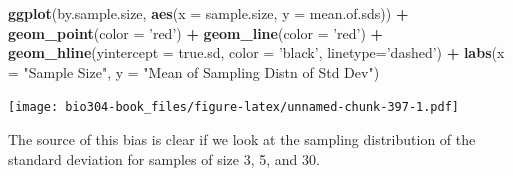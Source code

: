 \documentclass[]{book}
\newenvironment{Shaded}{\begin{snugshade}}{\end{snugshade}}
\newcommand{\CharTok}[1]{\textcolor[rgb]{0.31,0.60,0.02}{#1}}
\newcommand{\DataTypeTok}[1]{\textcolor[rgb]{0.13,0.29,0.53}{#1}}
\newcommand{\DecValTok}[1]{\textcolor[rgb]{0.00,0.00,0.81}{#1}}
\newcommand{\FloatTok}[1]{\textcolor[rgb]{0.00,0.00,0.81}{#1}}
\newcommand{\KeywordTok}[1]{\textcolor[rgb]{0.13,0.29,0.53}{\textbf{#1}}}
\newcommand{\NormalTok}[1]{#1}
\newcommand{\OperatorTok}[1]{\textcolor[rgb]{0.81,0.36,0.00}{\textbf{#1}}}
\newcommand{\StringTok}[1]{\textcolor[rgb]{0.31,0.60,0.02}{#1}}
\theoremstyle{definition}
\theoremstyle{definition}
\theoremstyle{definition}
\theoremstyle{remark}
\begin{document}
\begin{Shaded}
\begin{Highlighting}[]
\KeywordTok{ggplot}\NormalTok{(by.sample.size, }\KeywordTok{aes}\NormalTok{(}\DataTypeTok{x =}\NormalTok{ sample.size, }\DataTypeTok{y =}\NormalTok{ mean.of.sds)) }\OperatorTok{+}
\StringTok{  }\KeywordTok{geom_point}\NormalTok{(}\DataTypeTok{color =} \StringTok{'red'}\NormalTok{) }\OperatorTok{+}
\StringTok{  }\KeywordTok{geom_line}\NormalTok{(}\DataTypeTok{color =} \StringTok{'red'}\NormalTok{) }\OperatorTok{+}
\StringTok{  }\KeywordTok{geom_hline}\NormalTok{(}\DataTypeTok{yintercept =}\NormalTok{ true.sd, }\DataTypeTok{color =} \StringTok{'black'}\NormalTok{, }\DataTypeTok{linetype=}\StringTok{'dashed'}\NormalTok{) }\OperatorTok{+}
\StringTok{  }\KeywordTok{labs}\NormalTok{(}\DataTypeTok{x =} \StringTok{"Sample Size"}\NormalTok{, }\DataTypeTok{y =} \StringTok{"Mean of Sampling Distn of Std Dev"}\NormalTok{)}
\end{Highlighting}
\end{Shaded}

\texttt{[image: bio304-book\_files/figure-latex/unnamed-chunk-397-1.pdf]}

The source of this bias is clear if we look at the sampling distribution
of the standard deviation for samples of size 3, 5, and 30.

\begin{Shaded}
\end{Shaded}
\end{document}
